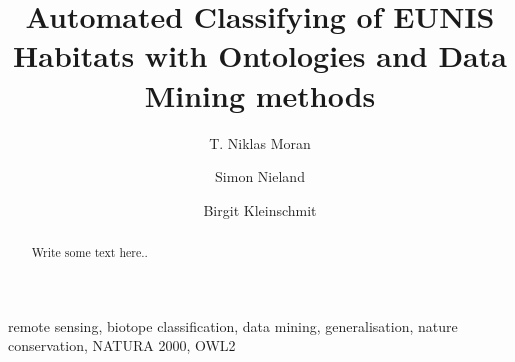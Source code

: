 \documentclass[authoryear, review,12pt,number]{elsarticle}
\begin{document}
\begin{frontmatter}
\linenumbers
\title{Automated Classifying of EUNIS Habitats with Ontologies and Data Mining
methods}


\author[TUB]{T. Niklas Moran}

\author[TUB]{Simon Nieland}
\author[TUB]{Birgit Kleinschmit}


\address[TUB]{Geoinformation in Environmental Planning Lab, Technische
Universit\"at Berlin, Stra\ss e des 17. Juni 145, 10623 Berlin, Germany}


\begin{abstract}
Write some text here..
\end{abstract}

\begin{keyword}
remote sensing, biotope classification, data mining,
generalisation, nature conservation, NATURA 2000, OWL2
\end{keyword}

\end{frontmatter}

\linenumbers
\end{document}
